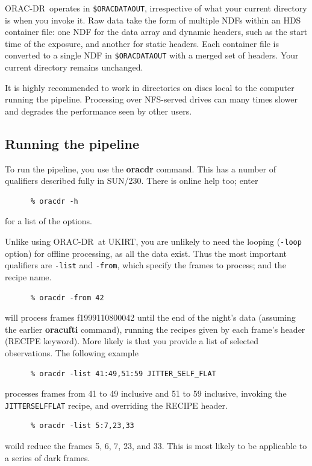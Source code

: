 \documentclass[twoside,11pt]{article}
\newcommand{\xref}[3]{#1}
\newcommand{\xlabel}[1]{}
\renewcommand{\_}{\texttt{\symbol{95}}}
\newcommand{\ORACDR}{{\footnotesize ORAC-DR}}
\begin{document}
\ORACDR\ operates in {\tt \$ORAC\_DATA\_OUT}, irrespective of
what your current directory is when you invoke it.  Raw data take the
form of multiple NDFs within an HDS container file: one NDF for the
data array and dynamic headers, such as the start time of the
exposure, and another for static headers.  Each container file is
converted to a single NDF in {\tt \$ORAC\_DATA\_OUT} with a merged set
of headers.  Your current directory remains unchanged.

It is highly recommended to work in directories on discs local to
the computer running the pipeline.  Processing over NFS-served drives
can many times slower and degrades the performance seen by other users.

\subsection{\xlabel{running_the_pipeline}Running the
pipeline\label{running_the_pipeline}}

To run the pipeline, you use the {\bf oracdr} command.  This has a
number of qualifiers described fully in \xref{SUN/230}{sun230}{oracdr}.
There is online help too; enter

\begin{verbatim}
      % oracdr -h
\end{verbatim}
for a list of the options.

Unlike using \ORACDR\ at UKIRT, you are unlikely to need the looping ({\tt -loop}
option) for offline processing, as all the data exist.  Thus the most
important qualifiers are {\tt -list} and {\tt -from}, which specify
the frames to process; and the recipe name.

\begin{verbatim}
      % oracdr -from 42
\end{verbatim}
will process frames f19991108\_00042 until the end of the night's data
(assuming the earlier {\bf orac\_ufti} command), running the recipes
given by each frame's header (RECIPE keyword).  More likely is that
you provide a list of selected observations.  The following example

\begin{verbatim}
      % oracdr -list 41:49,51:59 JITTER_SELF_FLAT
\end{verbatim}
processes frames from 41 to 49 inclusive and 51 to 59 inclusive,
invoking the {\tt JITTER\_SELF\_FLAT} recipe, and overriding
the RECIPE header.

\begin{verbatim}
      % oracdr -list 5:7,23,33
\end{verbatim}
woild reduce the frames 5, 6, 7, 23, and 33.  This is most likely
to be applicable to a series of dark frames.
\end{document}
